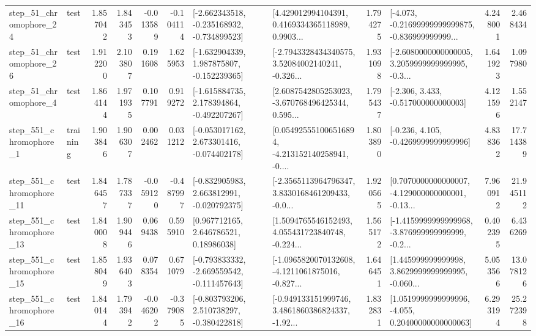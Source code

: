 \begin{tabular}{llrrrrllrlrr}
   step\_51\_chromophore\_24 &      test &      1.857042 &    1.843453 &     -0.013589 & -0.104114 &  [-2.662343518, -0.235168932, -0.734899523] &  [4.429012994104391, 0.4169334365118989, 0.9903... &       1.794275 &  [-4.073, -0.21699999999999875, -0.836999999999... &            4.248001 &          2.468434 \\
   step\_51\_chromophore\_26 &      test &      1.912200 &    2.103807 &      0.191608 &  1.625953 &   [-1.632904339, 1.987875807, -0.152239365] &  [-2.7943328434340575, 3.52084002140241, -0.326... &       1.931098 &  [-2.6080000000000005, 3.2059999999999995, -0.3... &            1.641923 &          1.097980 \\
    step\_51\_chromophore\_4 &      test &      1.864144 &    1.971935 &      0.107791 &  0.919272 &   [-1.615884735, 2.178394864, -0.492207267] &  [2.6087542805253023, -3.670768496425344, 0.595... &       1.795437 &                [-2.306, 3.433, -0.517000000000003] &            4.121596 &          1.552147 \\
   step\_551\_chromophore\_1 &  training &      1.903846 &    1.906307 &      0.002462 &  0.031212 &   [-0.053017162, 2.673301416, -0.074402178] &  [0.054925551006516894, -4.213152140258941, -0.... &       1.803890 &               [-0.236, 4.105, -0.4269999999999996] &            4.838362 &         17.714389 \\
  step\_551\_chromophore\_11 &      test &      1.846457 &    1.787337 &     -0.059120 & -0.487997 &   [-0.832905983, 2.663812991, -0.020792375] &  [-2.3565113964796347, 3.8330168461209433, -0.0... &       1.920565 &  [0.7070000000000007, -4.129000000000001, -0.13... &            7.960912 &         21.945112 \\
  step\_551\_chromophore\_13 &      test &      1.840008 &    1.909446 &      0.069438 &  0.595910 &      [0.967712165, 2.646786521, 0.18986038] &  [1.5094765546152493, 4.055431723840748, -0.224... &       1.565172 &  [-1.4159999999999968, -3.876999999999999, -0.2... &            0.402395 &          6.436269 \\
  step\_551\_chromophore\_15 &      test &      1.858049 &    1.936403 &      0.078354 &  0.671079 &  [-0.793833332, -2.669559542, -0.111457643] &  [-1.0965820070132608, -4.1211061875016, -0.827... &       1.646451 &  [1.445999999999998, 3.8629999999999995, -0.060... &            5.053566 &         13.078126 \\
  step\_551\_chromophore\_16 &      test &      1.840144 &    1.793942 &     -0.046202 & -0.379085 &   [-0.803793206, 2.510738297, -0.380422818] &  [-0.949133151999746, 3.4861860386824337, -1.92... &       1.832831 &  [1.0519999999999996, -4.055, 0.20400000000000063] &            6.293194 &         25.272398 \\

\end{tabular}
